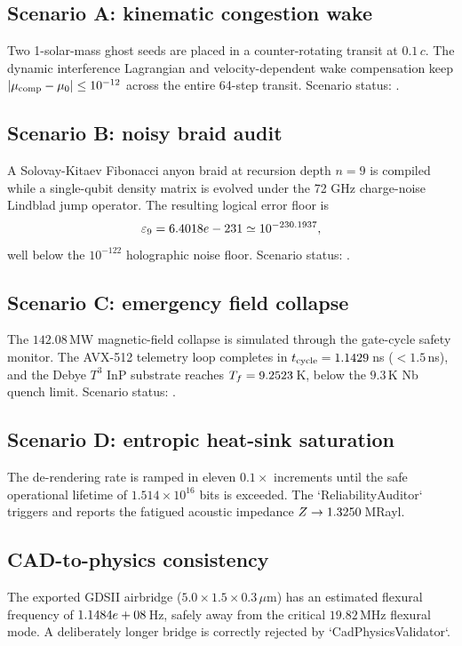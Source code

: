 \documentclass[aps,pra,10pt,onecolumn,superscriptaddress,nofootinbib,longbibliography,floatfix]{revtex4-2}
\begin{document}
\subsection{Scenario A: kinematic congestion wake}
Two 1-solar-mass ghost seeds are placed in a counter-rotating transit at $0.1\,c$.  The dynamic interference Lagrangian and velocity-dependent wake compensation keep $|\mu_{\rm comp}-\mu_0|\le10^{-12}$ across the entire 64-step transit.  Scenario status: \ExoticScenarioAStatus{}.

\subsection{Scenario B: noisy braid audit}
A Solovay-Kitaev Fibonacci anyon braid at recursion depth $n=9$ is compiled while a single-qubit density matrix is evolved under the 72 GHz charge-noise Lindblad jump operator.  The resulting logical error floor is
%
\begin{equation}
\varepsilon_9 = 6.4018e-231{} \simeq 10^{-230.1937},
\end{equation}
%
well below the $10^{-122}$ holographic noise floor.  Scenario status: \ExoticScenarioBStatus{}.

\subsection{Scenario C: emergency field collapse}
The $142.08\,$MW magnetic-field collapse is simulated through the gate-cycle safety monitor.  The AVX-512 telemetry loop completes in $t_{\rm cycle}=1.1429\,$ns ($<1.5\,$ns), and the Debye $T^3$ InP substrate reaches $T_f=9.2523\,$K, below the $9.3\,$K Nb quench limit.  Scenario status: \ExoticScenarioCStatus{}.

\subsection{Scenario D: entropic heat-sink saturation}
The de-rendering rate is ramped in eleven $0.1\times$ increments until the safe operational lifetime of $1.514\times10^{16}$ bits is exceeded.  The `ReliabilityAuditor` triggers \ExoticScenarioDStatus{} and reports the fatigued acoustic impedance $Z\to1.3250{}\,$MRayl.

\subsection{CAD-to-physics consistency}
The exported GDSII airbridge ($5.0\times1.5\times0.3\,\mu$m) has an estimated flexural frequency of $1.1484e+08\,$Hz, safely away from the critical $19.82\,$MHz flexural mode.  A deliberately longer bridge is correctly rejected by `CadPhysicsValidator`.
\end{document}
